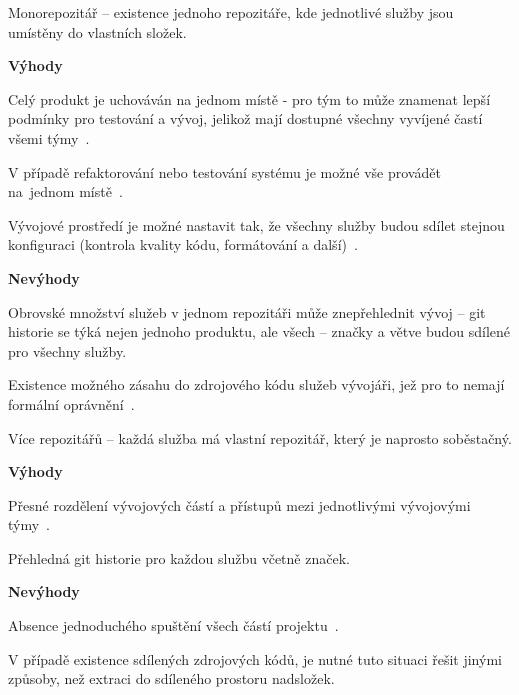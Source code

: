 \begin{dl}
   \item[Monorepozitář] – existence jednoho repozitáře, kde jednotlivé služby jsou umístěny do vlastních složek.

   \textbf{Výhody}
   \begin{ul}
      \item Celý produkt je uchováván na jednom místě - pro tým to může znamenat lepší podmínky pro testování a vývoj, jelikož mají dostupné všechny vyvíjené častí všemi týmy~\cite{monomulti}.
      \item V případě refaktorování nebo testování systému je možné vše provádět na~jednom místě~\cite{monomulti}.
      \item Vývojové prostředí je možné nastavit tak, že všechny služby budou sdílet stejnou konfiguraci (kontrola kvality kódu, formátování a další)~\cite{monomulti}.
   \end{ul}

   \textbf{Nevýhody}
   \begin{ul}
      \item Obrovské množství služeb v jednom repozitáři může znepřehlednit vývoj – git historie se týká nejen jednoho produktu, ale všech – značky a větve budou sdílené pro všechny služby.
      \item Existence možného zásahu do zdrojového kódu služeb vývojáři, jež pro to nemají formální oprávnění~\cite{monomulti}.
   \end{ul}

   \item[Více repozitářů] – každá služba má vlastní repozitář, který je naprosto soběstačný.

   \textbf{Výhody}
   \begin{ul}
      \item Přesné rozdělení vývojových částí a přístupů mezi jednotlivými vývojovými týmy~\cite{monomulti}.
      \item Přehledná git historie pro každou službu včetně značek.
   \end{ul}

   \textbf{Nevýhody}
   \begin{ul}
      \item Absence jednoduchého spuštění všech částí projektu~\cite{monomulti}.
      \item V případě existence sdílených zdrojových kódů, je nutné tuto situaci řešit jinými způsoby, než extraci do sdíleného prostoru nadsložek.
   \end{ul}
\end{dl}


